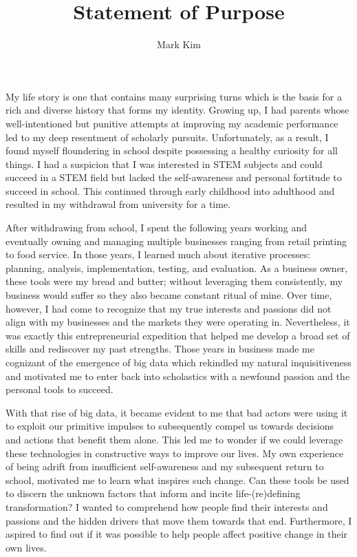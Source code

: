\documentclass[12pt]{article}
\title{Statement of Purpose}
\author{Mark Kim}
\begin{document}
\maketitle

My life story is one that contains many surprising turns which is the basis for
a rich and diverse history that forms my identity.  Growing up, I had parents
whose well-intentioned but punitive attempts at improving my academic
performance led to my deep resentment of scholarly pursuits.  Unfortunately, as
a result, I found myself floundering in school despite possessing a healthy
curiosity for all things.  I had a suspicion that I was interested in STEM
subjects and could succeed in a STEM field but lacked the self-awareness and
personal fortitude to succeed in school.  This continued through early childhood
into adulthood and resulted in my withdrawal from university for a time.

After withdrawing from school, I spent the following years working and
eventually owning and managing multiple businesses ranging from retail printing
to food service.  In those years, I learned much about iterative processes:
planning, analysis, implementation, testing, and evaluation.  As a business
owner, these tools were my bread and butter; without leveraging them
consistently, my business would suffer so they also became constant ritual of mine.
Over time, however, I had come to recognize that my true interests and
passions did not align with my businesses and the markets they were operating
in. Nevertheless, it was exactly this entrepreneurial expedition that helped me
develop a broad set of skills and rediscover my past strengths.  Those years in
business made me cognizant of the emergence of big data which rekindled my natural
inquisitiveness and motivated me to enter back into scholastics with a newfound
passion and the personal tools to succeed.

With that rise of big data, it became evident to me that bad actors were using
it to exploit our primitive impulses to subsequently compel us towards decisions
and actions that benefit them alone.  This led me to wonder if we could leverage
these technologies in constructive ways to improve our lives.  My own experience
of being adrift from insufficient self-awareness and my subsequent return to
school, motivated me to learn what inspires such change.  Can these tools be
used to discern the unknown factors that inform and incite life-(re)defining
transformation?  I wanted to comprehend how people find their interests and
passions and the hidden drivers that move them towards that end.  Furthermore, I
aspired to find out if it was possible to help people affect positive change in
their own lives.
\end{document}
